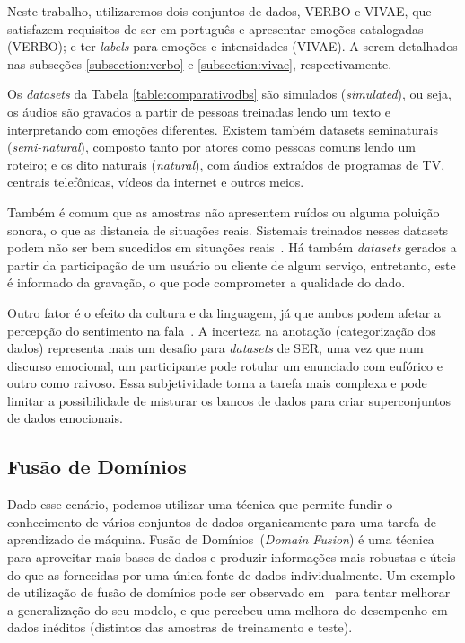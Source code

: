 Neste trabalho, utilizaremos dois conjuntos de dados, VERBO e VIVAE, que satisfazem requisitos de ser em português e apresentar emoções catalogadas (VERBO); e ter \textit{labels} para emoções e intensidades (VIVAE). A serem detalhados nas subseções \ref{subsection:verbo} e \ref{subsection:vivae}, respectivamente.

Os \textit{datasets} da Tabela \ref{table:comparativodbs} são simulados (\textit{simulated}), ou seja, os áudios são gravados a partir de pessoas treinadas lendo um texto e interpretando com emoções diferentes. Existem também datasets seminaturais (\textit{semi-natural}), composto tanto por atores como pessoas comuns lendo um roteiro; e os dito naturais (\textit{natural}), com áudios extraídos de programas de TV, centrais telefônicas, vídeos da internet e outros meios.

Também é comum que as amostras não apresentem ruídos ou alguma poluição sonora, o que as distancia de situações reais. Sistemais treinados nesses datasets podem não ser bem sucedidos em situações reais~\cite{32}. Há também \textit{datasets} gerados a partir da participação de um usuário ou cliente de algum serviço, entretanto, este é informado da gravação, o que pode comprometer a qualidade do dado.

Outro fator é o efeito da cultura e da linguagem, já que ambos podem afetar a percepção do sentimento na fala~\cite{32}. A incerteza na anotação (categorização dos dados) representa mais um desafio para \textit{datasets} de \acrshort{SER}, uma vez que num discurso emocional, um participante pode rotular um enunciado com eufórico e outro como raivoso. Essa subjetividade torna a tarefa mais complexa e pode limitar a possibilidade de misturar os bancos de dados para criar superconjuntos de dados emocionais.

\subsection{Fusão de Domínios}

Dado esse cenário, podemos utilizar uma técnica que permite fundir o conhecimento de vários conjuntos de dados organicamente para uma tarefa de aprendizado de máquina. Fusão de Domínios~\cite{49}(\textit{Domain Fusion}) é uma técnica para aproveitar mais bases de dados e produzir informações mais robustas e úteis do que as fornecidas por uma única fonte de dados individualmente. Um exemplo de utilização de fusão de domínios pode ser observado em~\cite{3} para tentar melhorar a generalização do seu modelo, e que percebeu uma melhora do desempenho em dados inéditos (distintos das amostras de treinamento e teste).

